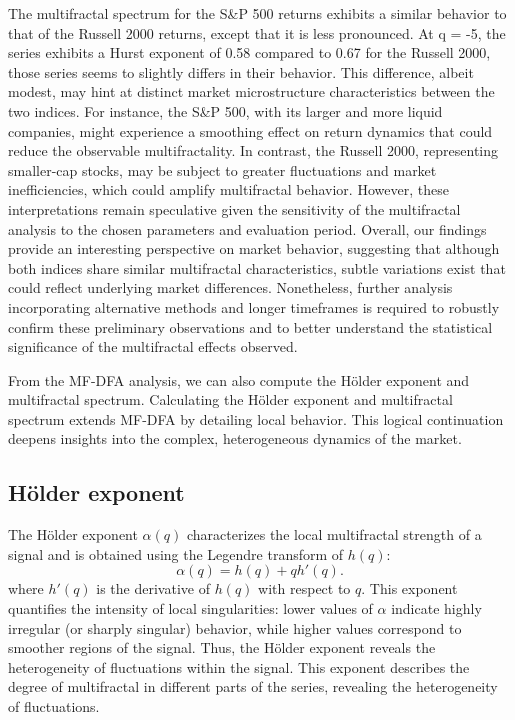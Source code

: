 \documentclass[11pt]{extarticle}
\begin{document}
The multifractal spectrum for the S\&P 500 returns exhibits a similar behavior to that of the Russell 2000 returns,
except that it is less pronounced. At q = -5, the series exhibits a Hurst exponent of 0.58 compared to 0.67 for the
Russell 2000, those series seems to slightly differs in their behavior.
This difference, albeit modest, may hint at distinct market microstructure characteristics between the two indices.
For instance, the S\&P 500, with its larger and more liquid companies, might experience a smoothing effect on return
dynamics that could reduce the observable multifractality. In contrast, the Russell 2000, representing smaller-cap
stocks, may be subject to greater fluctuations and market inefficiencies, which could amplify multifractal behavior.
However, these interpretations remain speculative given the sensitivity of the multifractal analysis to the chosen
parameters and evaluation period.
Overall, our findings provide an interesting perspective on market behavior, suggesting that although both indices
share similar multifractal characteristics, subtle variations exist that could reflect underlying market differences.
Nonetheless, further analysis incorporating alternative methods and longer timeframes is required to robustly confirm
these preliminary observations and to better understand the statistical significance of the multifractal effects observed.

From the MF-DFA analysis, we can also compute the Hölder exponent and multifractal spectrum.
Calculating the Hölder exponent and multifractal spectrum extends MF-DFA by detailing local behavior.
This logical continuation deepens insights into the complex, heterogeneous dynamics of the market.



\subsection{Hölder exponent}
The Hölder exponent $\alpha(q)$ characterizes the local multifractal strength of a signal and is obtained using the Legendre transform of $h(q)$:
\begin{equation}
\alpha(q) = h(q) + q h'(q).
\end{equation}
where $h'(q)$ is the derivative of $h(q)$ with respect to $q$. This exponent quantifies the intensity of local
singularities: lower values of $\alpha$ indicate highly irregular (or sharply singular) behavior, while higher
values correspond to smoother regions of the signal. Thus, the Hölder exponent reveals the heterogeneity of fluctuations within the signal.
This exponent describes the degree of multifractal in different parts of the series, revealing the heterogeneity of fluctuations.
\end{document}
